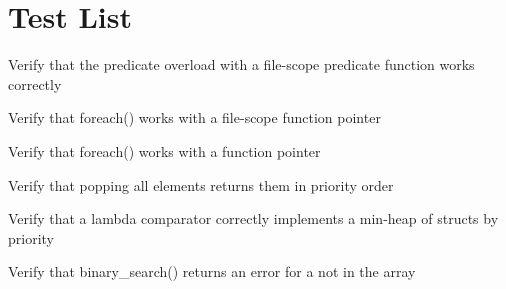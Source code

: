 \chapter{Test List}
\hypertarget{test}{}\label{test}

\begin{DoxyRefList}
\item[Global \doxylink{test__array_8cpp_aefda0537bfa058b145e2377a0e3e19c6}{eq\+\_\+nontrivial\+\_\+by\+\_\+id} (const \doxylink{classNonTrivial}{Non\+Trivial} \&a, const \doxylink{classNonTrivial}{Non\+Trivial} \&b)]\label{test__test000181}%
%
Verify that the predicate overload with a file-\/scope predicate function works correctly  
\item[Global \doxylink{test__dict_8cpp_a7b891a6eb1bbcacc1a86085c213780d1}{g\+\_\+foreach\+\_\+count} ]\label{test__test000253}%
%
Verify that foreach() works with a file-\/scope function pointer  
\item[Global \doxylink{test__heap_8cpp_a1ad1a91e5152be73d783768551bdef50}{g\+\_\+heap\+\_\+foreach\+\_\+sum} ]\label{test__test000295}%
%
Verify that foreach() works with a function pointer  
\item[Global \doxylink{test__heap_8cpp_a70a5e7b7872845d159085be990c460fd}{TEST} (Heap\+Task\+Test, Pop\+Tasks\+In\+Priority\+Order)]\label{test__test000301}%
%
Verify that popping all  elements returns them in priority order  
\item[Global \doxylink{test__heap_8cpp_ab3f979e8fc2723481b236f0aecac16a1}{TEST} (Heap\+Task\+Test, Lambda\+Comparator\+Min\+Priority\+Heap)]\label{test__test000300}%
%
Verify that a lambda comparator correctly implements a min-\/heap of  structs by priority  
\item[Global \doxylink{test__array_8cpp_a340007c92275074f196be22efb30f573}{TEST\+\_\+F} (\doxylink{classArrayInitTest}{Array\+Init\+Test}, Binary\+Search\+Point\+Not\+Found\+Returns\+Error)]\label{test__test000197}%
%
Verify that binary\+\_\+search() returns an error for a  not in the array  
\item[Global \doxylink{test__array_8cpp_a07505aa526c9a95661578ed491148fcc}{TEST\+\_\+F} (\doxylink{classArrayInitTest}{Array\+Init\+Test}, Bracketed\+Binary\+Search\+Int\+Above\+Range\+Returns\+Error)]\label{test__test000205}%

\end{DoxyRefList}

